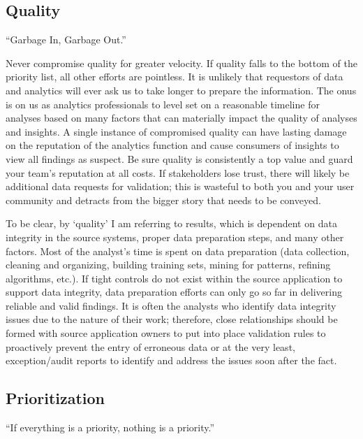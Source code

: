 \documentclass[]{book}
\begin{document}
\hypertarget{quality}{%
\subsection{Quality}\label{quality}}

``Garbage In, Garbage Out.''

Never compromise quality for greater velocity. If quality falls to the bottom of the priority list, all other efforts are pointless. It is unlikely that requestors of data and analytics will ever ask us to take longer to prepare the information. The onus is on us as analytics professionals to level set on a reasonable timeline for analyses based on many factors that can materially impact the quality of analyses and insights. A single instance of compromised quality can have lasting damage on the reputation of the analytics function and cause consumers of insights to view all findings as suspect. Be sure quality is consistently a top value and guard your team's reputation at all costs. If stakeholders lose trust, there will likely be additional data requests for validation; this is wasteful to both you and your user community and detracts from the bigger story that needs to be conveyed.

To be clear, by `quality' I am referring to results, which is dependent on data integrity in the source systems, proper data preparation steps, and many other factors. Most of the analyst's time is spent on data preparation (data collection, cleaning and organizing, building training sets, mining for patterns, refining algorithms, etc.). If tight controls do not exist within the source application to support data integrity, data preparation efforts can only go so far in delivering reliable and valid findings. It is often the analysts who identify data integrity issues due to the nature of their work; therefore, close relationships should be formed with source application owners to put into place validation rules to proactively prevent the entry of erroneous data or at the very least, exception/audit reports to identify and address the issues soon after the fact.

\hypertarget{prioritization}{%
\subsection{Prioritization}\label{prioritization}}

``If everything is a priority, nothing is a priority.''
\end{document}
